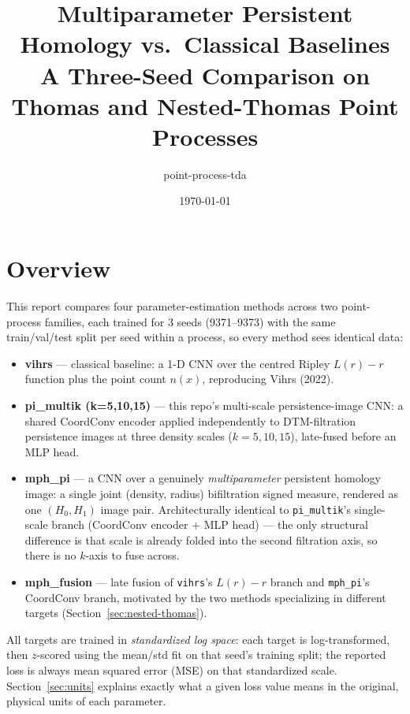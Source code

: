 \documentclass[11pt]{article}
\title{Multiparameter Persistent Homology vs.\ Classical Baselines\\
\large A Three-Seed Comparison on Thomas and Nested-Thomas Point Processes}
\author{point-process-tda}
\date{\today}
\begin{document}
\maketitle
\vspace{-2em}

\tableofcontents

\section{Overview}

This report compares four parameter-estimation methods across two point-process
families, each trained for 3 seeds (9371--9373) with the same train/val/test split
per seed within a process, so every method sees identical data:

\begin{itemize}
  \item \textbf{vihrs} --- classical baseline: a 1-D CNN over the centred Ripley
    $L(r)-r$ function plus the point count $n(x)$, reproducing Vihrs (2022).
  \item \textbf{pi\_multik (k=5,10,15)} --- this repo's multi-scale persistence-image
    CNN: a shared CoordConv encoder applied independently to DTM-filtration
    persistence images at three density scales ($k=5,10,15$), late-fused before an
    MLP head.
  \item \textbf{mph\_pi} --- a CNN over a genuinely \emph{multiparameter} persistent
    homology image: a single joint (density, radius) bifiltration signed measure,
    rendered as one $(H_0,H_1)$ image pair. Architecturally identical to
    \texttt{pi\_multik}'s single-scale branch (CoordConv encoder + MLP head) ---
    the only structural difference is that scale is already folded into the second
    filtration axis, so there is no $k$-axis to fuse across.
  \item \textbf{mph\_fusion} --- late fusion of \texttt{vihrs}'s $L(r)-r$ branch and
    \texttt{mph\_pi}'s CoordConv branch, motivated by the two methods specializing
    in different targets (Section~\ref{sec:nested-thomas}).
\end{itemize}

All targets are trained in \emph{standardized log space}: each target is
log-transformed, then $z$-scored using the mean/std fit on that seed's training
split; the reported loss is always mean squared error (MSE) on that standardized
scale. Section~\ref{sec:units} explains exactly what a given loss value means in
the original, physical units of each parameter.
\end{document}

